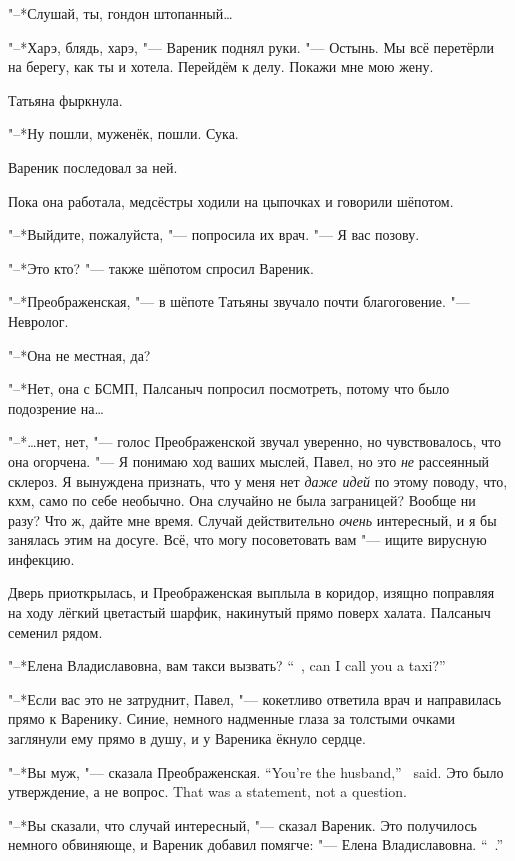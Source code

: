 "--*Слушай, ты, гондон штопанный\ldots{}

"--*Харэ, блядь, харэ, "--- Вареник поднял руки.
"--- Остынь.
Мы всё перетёрли на берегу, как ты и хотела.
Перейдём к делу.
Покажи мне мою жену.

Татьяна фыркнула.

"--*Ну пошли, муженёк, пошли.
Сука.

Вареник последовал за ней.

\asterism

\textspace

Пока она работала, медсёстры ходили на цыпочках и говорили шёпотом.

"--*Выйдите, пожалуйста, "--- попросила их врач.
"--- Я вас позову.

"--*Это кто? "--- также шёпотом спросил Вареник.

"--*Преображенская, "--- в шёпоте Татьяны звучало почти благоговение.
"--- Невролог.

"--*Она не местная, да?

"--*Нет, она с БСМП, Палсаныч попросил посмотреть, потому что было подозрение на\ldots{}

"--*\ldots{}нет, нет, "--- голос Преображенской звучал уверенно, но чувствовалось, что она огорчена.
"--- Я понимаю ход ваших мыслей, Павел, но это \emph{не} рассеянный склероз.
Я вынуждена признать, что у меня нет \emph{даже идей} по этому поводу, что, кхм, само по себе необычно.
Она случайно не была заграницей?
Вообще ни разу?
Что ж, дайте мне время.
Случай действительно \emph{очень} интересный, и я бы занялась этим на досуге.
Всё, что могу посоветовать вам "--- ищите вирусную инфекцию.

Дверь приоткрылась, и Преображенская выплыла в коридор, изящно поправляя на ходу лёгкий цветастый шарфик, накинутый прямо поверх халата.
Палсаныч семенил рядом.

{"--*Елена Владиславовна, вам такси вызвать?}
{``\Yelena\ \Vladislavovna, can I call you a taxi?''}

"--*Если вас это не затруднит, Павел, "--- кокетливо ответила врач и направилась прямо к Варенику.
Синие, немного надменные глаза за толстыми очками заглянули ему прямо в душу, и у Вареника ёкнуло сердце.

{"--*Вы муж, "--- сказала Преображенская.}
{``You're the husband,'' \Preobrazhenskaya\ said.}
{Это было утверждение, а не вопрос.}
{That was a statement, not a question.}

"--*Вы сказали, что случай интересный, "--- сказал Вареник.
Это получилось немного обвиняюще, и Вареник добавил помягче:
{"--- Елена Владиславовна.}
{``\Yelena\ \Vladislavovna.''}

